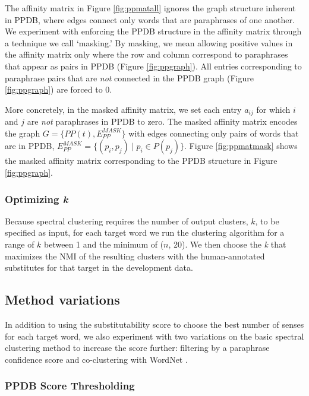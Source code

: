 \documentclass[11pt]{article}
\begin{document}
	The affinity matrix in Figure \ref{fig:ppmatall} ignores the graph structure inherent in PPDB, where edges connect only words that are paraphrases of one another. We experiment with enforcing the PPDB structure in the affinity matrix through a technique we call `masking.' By masking, we mean allowing positive values in the affinity matrix only where the row and column correspond to paraphrases that appear as pairs in PPDB (Figure \ref{fig:ppgraph}). All entries corresponding to paraphrase pairs that are \textit{not} connected in the PPDB graph (Figure \ref{fig:ppgraph}) are forced to 0.
	
	More concretely, in the masked affinity matrix, we set each entry $a_{ij}$ for which $i$ and $j$ are \textit{not} paraphrases in PPDB to zero. The masked affinity matrix encodes the graph $G = \{PP(t), E_{PP}^{MASK}\}$ with edges connecting only pairs of words that are in PPDB, $E_{PP}^{MASK} = \{(p_i, p_j) \mid p_i \in P(p_j)\}$. Figure \ref{fig:ppmatmask} shows the masked affinity matrix corresponding to the PPDB structure in Figure \ref{fig:ppgraph}.
	
	\subsubsection{Optimizing \textit{k}}
	\label{optimk}
	
	Because spectral clustering requires the number of output clusters, $k$, to be specified as input, for each target word we run the clustering algorithm for a range of $k$ between 1 and the minimum of ($n$,  20). We then choose the \textit{k} that maximizes the NMI of the resulting clusters with the human-annotated substitutes for that target in the development data.
	
	\subsection{Method variations}
	
	In addition to using the substitutability score to choose the best number of senses for each target word, we also experiment with 
	two variations on the basic spectral clustering method to increase the score further: filtering by a paraphrase confidence score and co-clustering with WordNet \cite{fellbaum98wordnet}. 
	
	\subsubsection{PPDB Score Thresholding}
	
\end{document}
